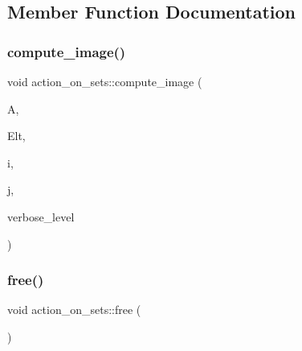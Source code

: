 \subsection{Member Function Documentation}
\mbox{\label{classaction__on__sets_a4e97b6c049755220ec5a2ef12397da01}} 
\subsubsection{\texorpdfstring{compute\+\_\+image()}{compute\_image()}}
{\footnotesize\ttfamily void action\+\_\+on\+\_\+sets\+::compute\+\_\+image (\begin{DoxyParamCaption}\item[{\mbox{\hyperlink{classaction}{action}} $\ast$}]{A,  }\item[{\mbox{\hyperlink{galois_8h_a09fddde158a3a20bd2dcadb609de11dc}{I\+NT}} $\ast$}]{Elt,  }\item[{\mbox{\hyperlink{galois_8h_a09fddde158a3a20bd2dcadb609de11dc}{I\+NT}}}]{i,  }\item[{\mbox{\hyperlink{galois_8h_a09fddde158a3a20bd2dcadb609de11dc}{I\+NT}} \&}]{j,  }\item[{\mbox{\hyperlink{galois_8h_a09fddde158a3a20bd2dcadb609de11dc}{I\+NT}}}]{verbose\+\_\+level }\end{DoxyParamCaption})}

\mbox{\label{classaction__on__sets_ab92161d21c1b55331f46c72a9cb7d575}} 
\subsubsection{\texorpdfstring{free()}{free()}}
{\footnotesize\ttfamily void action\+\_\+on\+\_\+sets\+::free (\begin{DoxyParamCaption}{ }\end{DoxyParamCaption})}

\mbox{\label{classaction__on__sets_a1075f47e9a27352a596cff7f5f599f2f}} 
